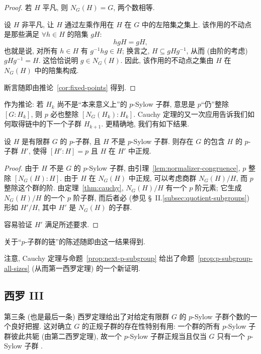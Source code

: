 \begin{proof}
若 $H$ 平凡, 则 $N_G(H) = G$, 两个数相等.

设 $H$ 非平凡, 让 $H$ 通过左乘作用在 $H$ 在 $G$ 中的左陪集之集上. 该作用的不动点是那些满足 $\forall h \in H$ 的陪集 $gH$:
\[
hgH = gH,
\]
也就是说, 对所有 $h \in H$ 有 $g^{-1}hg \in H$; 换言之, $H \subseteq gHg^{-1}$, 从而 (由阶的考虑) $gHg^{-1} = H$. 这恰恰说明 $g \in N_G(H)$. 因此, 该作用的不动点之集由 $H$ 在 $N_G(H)$ 中的陪集构成.

断言随即由推论~\ref{cor:fixed-points} 得到.
\end{proof}

作为推论: 若 $H_k$ 尚不是``本来意义上''的 $p$-Sylow 子群, 意思是 $p$``仍''整除 $[G:H_k]$, 则 $p$ 必也整除 $[N_G(H_k):H_k]$. Cauchy 定理的又一次应用告诉我们如何取得链中的下一个子群 $H_{k+1}$. 更精确地, 我们有如下结果.

\begin{proposition}
\label{prop:next-p-subgroup}
设 $H$ 是有限群 $G$ 的 $p$-子群, 且 $H$ 不是 $p$-Sylow 子群. 则存在 $G$ 的包含 $H$ 的 $p$-子群 $H'$, 使得 $[H':H] = p$ 且 $H$ 在 $H'$ 中正规.
\end{proposition}

\begin{proof}
由于 $H$ 不是 $G$ 的 $p$-Sylow 子群, 由引理~\ref{lem:normalizer-congruence}, $p$ 整除 $[N_G(H):H]$. 由于 $H$ 在 $N_G(H)$ 中正规, 可以考虑商群 $N_G(H)/H$, 而 $p$ 整除这个群的阶. 由定理~\ref{thm:cauchy}, $N_G(H)/H$ 有一个 $p$ 阶元素; 它生成 $N_G(H)/H$ 的一个 $p$ 阶子群, 而后者必 (参见 \S~II.\ref{subsec:quotient-subgroups}) 形如 $H'/H$, 其中 $H'$ 是 $N_G(H)$ 的子群.

容易验证 $H'$ 满足所述要求.
\end{proof}

关于``$p$-子群的链''的陈述随即由这一结果得到.

注意, Cauchy 定理与命题~\ref{prop:next-p-subgroup} 给出了命题~\ref{prop:p-subgroup-all-sizes} (从而第一西罗定理) 的一个新证明.

\subsection{西罗 III}
\label{subsec:sylow-III}

第三条 (也是最后一条) 西罗定理给出了对给定有限群 $G$ 的 $p$-Sylow 子群个数的一个良好把握. 这对确立 $G$ 的正规子群的存在性特别有用: 一个群的所有 $p$-Sylow 子群彼此共轭 (由第二西罗定理), 故一个 $p$-Sylow 子群正规当且仅当 $G$ 只有一个 $p$-Sylow 子群%
.

